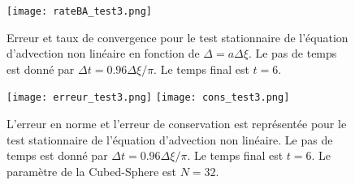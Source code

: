 \documentclass[11pt]{beamer}
\begin{document}
\begin{frame}
\begin{figure}[htbp]
\begin{center}
\texttt{[image: rateBA\_test3.png]}
\end{center}
\caption{Erreur et taux de convergence pour le test stationnaire de l'équation d'advection non linéaire en fonction de $\Delta = a \Delta \xi$. Le pas de temps est donné par $\Delta t = 0.96 \Delta \xi / \pi$. Le temps final est $t=6$.}
\label{fig:benartzi_test3}
\end{figure}
\end{frame}





\begin{frame}
\begin{figure}[htbp]
\begin{center}
\texttt{[image: erreur\_test3.png]}
\texttt{[image: cons\_test3.png]}
\end{center}
\caption{ L'erreur en norme et l'erreur de conservation est représentée pour le test stationnaire de l'équation d'advection non linéaire. Le pas de temps est donné par $\Delta t = 0.96 \Delta \xi / \pi$. Le temps final est $t=6$. Le paramètre de la Cubed-Sphere est $N=32$.}
\label{fig:benartzi_test3_hist}
\end{figure}
\end{frame}














\end{document}
